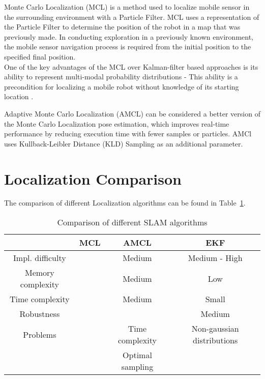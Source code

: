\documentclass[12pt, a4paper, onecolumn]{article}
\begin{document}
Monte Carlo Localization (MCL) is a method used to localize mobile sensor in the surrounding environment with a Particle Filter. 
MCL uses a representation of the Particle Filter to determine the position of the robot in a map that was previously made.
In conducting exploration in a previously known environment, the mobile sensor navigation process is required from the initial position to the specified final position. \\

One of the key advantages of the MCL over Kalman-filter based approaches is its ability to represent multi-modal probability distributions - This ability is a precondition for localizing a mobile robot without knowledge of its starting location \cite{MCL99}.

Adaptive Monte Carlo Localization (AMCL) can be considered a better version of the Monte Carlo Localization pose estimation, which improves real-time performance by reducing execution time with fewer samples or particles. 
AMCl uses Kullback-Leibler Distance (KLD) Sampling as an additional parameter. \cite{AMCL19}

\section{Localization Comparison}
The comparison of different Localization algorithms can be found in Table~\ref{tab:slam_algorithms}.
\begin{table}[h!]
  \begin{center}
    \begin{tabular}[c]{|c | c c c |}
      \hline
                       & MCL   & AMCL          & EKF                 \\
      \hline
      Impl. difficulty &       & Medium        & Medium - High       \\
      \hline
      Memory complexity&       & Medium        & Low                 \\
      \hline
      Time complexity  &       & Medium        & Small               \\
      \hline
      Robustness       &       &               & Medium              \\
      \hline
      Problems         &       & Time complexity & Non-gaussian distributions \\
                       &       & Optimal sampling & 
      \hline
    \end{tabular}
  \end{center}
  \caption{Comparison of different SLAM algorithms}
  \label{tab:slam_algorithms}
\end{table}
\end{document}

